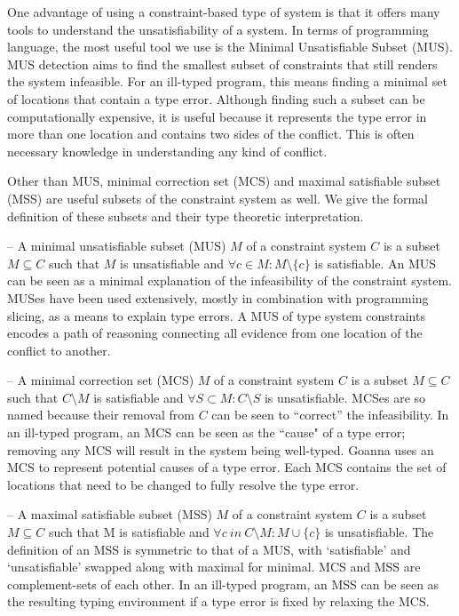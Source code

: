 One advantage of using a constraint-based type of system is that it offers many tools to understand the unsatisfiability of a system. In terms of programming language, the most useful tool we use is the Minimal Unsatisfiable Subset (MUS).  MUS detection aims to find the smallest subset of constraints that still renders the system infeasible. For an ill-typed program, this means finding a minimal set of locations that contain a type error. Although finding such a subset can be computationally expensive, it is useful because it represents the type error in more than one location and contains two sides of the conflict. This is often necessary knowledge in understanding any kind of conflict.


Other than MUS, minimal correction set (MCS) and  maximal satisfiable subset (MSS) are useful subsets of the constraint system as well. We give the formal definition of these subsets and their type theoretic interpretation.



– A minimal unsatisfiable subset (MUS) $M$ of a constraint system $C$ is a subset $M \subseteq C$ such that $M$ is unsatisfiable and $ \forall{c} \in M : M \setminus \{c\}$ is satisfiable. An MUS can be seen as a minimal explanation of the infeasibility of the constraint system. MUSes have been used extensively, mostly in combination with programming slicing, as a means to explain type errors. A MUS of type system constraints encodes a path of reasoning connecting all evidence from one location of the conflict to another.


– A minimal correction set (MCS) $M$ of a constraint system $C$ is a subset $M \subseteq C$ such that $C \setminus M$ is satisfiable and $\forall{S} \subset M : C \setminus S$ is unsatisfiable. MCSes are so named because their removal from $C$ can be seen to “correct” the infeasibility. In an ill-typed program, an MCS can be seen as the ``cause" of a type error; removing any MCS will result in the system being well-typed. Goanna uses an MCS to represent potential causes of a type error. Each MCS contains the set of locations that need to be changed to fully resolve the type error.

  

– A maximal satisfiable subset (MSS) $M$ of a constraint system $C$ is a subset $M \subseteq C$ such that M is satisfiable and $\forall{c}\ in\ C \setminus M:M\cup\{c\}$ is unsatisfiable. The definition of an MSS is symmetric to that of a MUS, with `satisfiable' and `unsatisfiable' swapped along with maximal for minimal. MCS and MSS are complement-sets of each other. In an ill-typed program, an MSS can be seen as the resulting typing environment if a type error is fixed by relaxing the MCS.

